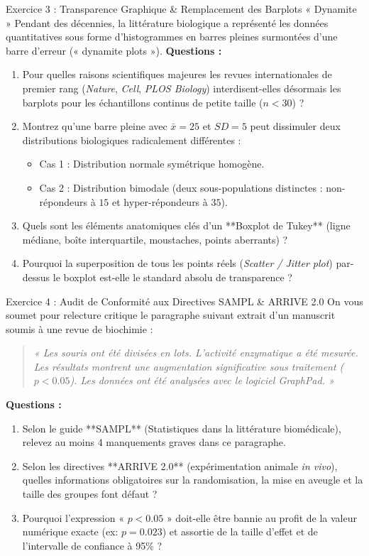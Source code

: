 \documentclass[11pt,a4paper]{article}
\begin{document}
\begin{exercicebox}{Exercice 3 : Transparence Graphique \& Remplacement des Barplots « Dynamite »}
Pendant des décennies, la littérature biologique a représenté les données quantitatives sous forme d'histogrammes en barres pleines surmontées d'une barre d'erreur (« dynamite plots »).
\textbf{Questions :}
\begin{enumerate}[label=\textbf{\alph*.}]
  \item Pour quelles raisons scientifiques majeures les revues internationales de premier rang (\textit{Nature}, \textit{Cell}, \textit{PLOS Biology}) interdisent-elles désormais les barplots pour les échantillons continus de petite taille ($n < 30$) ?
  \item Montrez qu'une barre pleine avec $\bar{x} = 25$ et $SD = 5$ peut dissimuler deux distributions biologiques radicalement différentes :
  \begin{itemize}
    \item Cas 1 : Distribution normale symétrique homogène.
    \item Cas 2 : Distribution bimodale (deux sous-populations distinctes : non-répondeurs à $15$ et hyper-répondeurs à $35$).
  \end{itemize}
  \item Quels sont les éléments anatomiques clés d'un **Boxplot de Tukey** (ligne médiane, boîte interquartile, moustaches, points aberrants) ?
  \item Pourquoi la superposition de tous les points réels (\textit{Scatter / Jitter plot}) par-dessus le boxplot est-elle le standard absolu de transparence ?
\end{enumerate}
\end{exercicebox}

\begin{exercicebox}{Exercice 4 : Audit de Conformité aux Directives SAMPL \& ARRIVE 2.0}
On vous soumet pour relecture critique le paragraphe suivant extrait d'un manuscrit soumis à une revue de biochimie :
\begin{quote}
  \textit{« Les souris ont été divisées en lots. L'activité enzymatique a été mesurée. Les résultats montrent une augmentation significative sous traitement ($p < 0.05$). Les données ont été analysées avec le logiciel GraphPad. »}
\end{quote}

\textbf{Questions :}
\begin{enumerate}[label=\textbf{\alph*.}]
  \item Selon le guide **SAMPL** (Statistiques dans la littérature biomédicale), relevez au moins 4 manquements graves dans ce paragraphe.
  \item Selon les directives **ARRIVE 2.0** (expérimentation animale \textit{in vivo}), quelles informations obligatoires sur la randomisation, la mise en aveugle et la taille des groupes font défaut ?
  \item Pourquoi l'expression « $p < 0.05$ » doit-elle être bannie au profit de la valeur numérique exacte (ex: $p = 0.023$) et assortie de la taille d'effet et de l'intervalle de confiance à 95\% ?
\end{enumerate}
\end{exercicebox}
\end{document}
